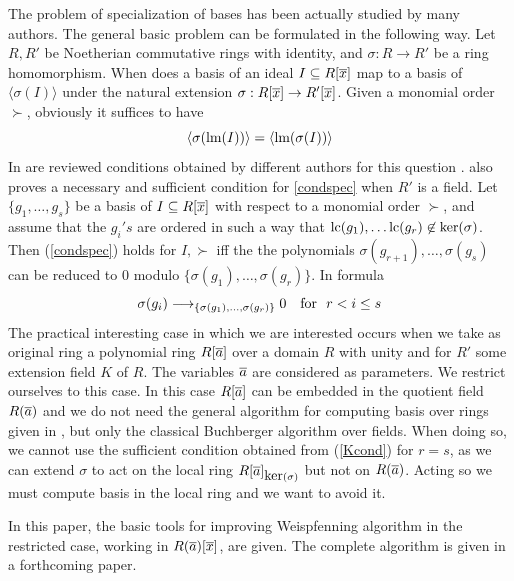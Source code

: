  The problem of specialization of \Gr bases has been actually studied
 by many authors. The general basic problem can be formulated in the following way.
 Let $R,R'$ be Noetherian commutative rings with
 identity, and $\sigma: R \rightarrow R'$ be a ring homomorphism.
 When does a \Gr basis of an ideal $I \subseteq
 R[\overline{x}]$ map to a \Gr basis of $\langle
 \sigma(I)\rangle$ under the natural extension $\sigma: R[\overline{x}]
 \rightarrow R'[\overline{x}]$.
 Given a monomial
 order $\succ$, obviously it suffices to have
 \begin{equation}
  \langle \sigma(\hbox{\rm lm}(I)) \rangle = \langle \hbox{\rm lm}(\sigma(I))
 \rangle \label{condspec}
 \end{equation}
 In \cite{Kalk97} are reviewed conditions obtained by different authors
 for this question \cite{Gianni87,BGS91,Pauer92,Grabe93,Assi94}.
  also proves  a necessary and
 sufficient condition for \ref{condspec} when $R'$ is a field.
 Let $\{g_1,\dots,g_s\}$
 be a \Gr basis of $I \subseteq R[\overline{x}]$ with respect to a monomial
 order $\succ$, and assume that the $g_i's$ are ordered in
 such a way that $\hbox{\rm lc}(g_1),\dots\hbox{\rm lc}(g_r) \not\in \hbox{\rm
 ker}(\sigma)$. Then (\ref{condspec}) holds for $I,\succ$ iff the
 the polynomials $\sigma(g_{r+1}),\dots,\sigma(g_s)$ can be
 reduced to 0 modulo $\{\sigma(g_1),\dots,\sigma(g_r)\}$. In
 formula
  \begin{equation}
  \sigma(g_i) \longrightarrow_{\{\sigma(g_1),\dots,\sigma(g_r)\}} 0
   \ \ \ \hbox{for } \ r < i \le s \label{Kcond}
  \end{equation}
 The practical interesting case in which we are interested
 occurs when we take as original ring
 a polynomial ring $R[\overline{a}]$ over a domain $R$ with unity and for
 $R'$ some extension field $K$ of $R$. The variables $\overline{a}$ are
 considered as parameters. We restrict ourselves to
 this case. In this case $R[\overline{a}]$ can be embedded in the quotient field $R(\overline{a})$
 and we do not need the general algorithm for
 computing \Gr basis over rings given in \cite{Moll88}, but only the
 classical Buchberger algorithm over fields. When doing so, we
 cannot use the sufficient condition obtained from
 (\ref{Kcond}) for $r=s$, as we can extend $\sigma$ to act on
 the local ring $R[\overline{a}]_{\hbox{\rm ker}(\sigma)}$ but not on
 $R(\overline{a})$. Acting so we must compute \Gr basis in the local ring and we
 want to avoid it.

 In this paper, the basic tools for improving Weispfenning algorithm
 in the restricted case, working in $R(\overline{a})[\overline{x}]$, are given.
 The complete algorithm is given in a forthcoming paper.

